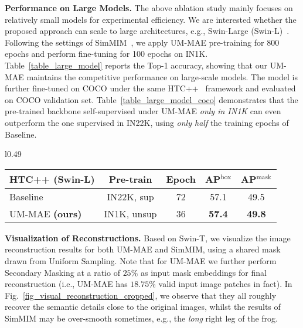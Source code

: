 \documentclass{article}
\begin{document}
\textbf{Performance on Large Models.} The above ablation study mainly focuses on relatively small models for experimental efficiency. We are interested whether the proposed approach can scale to large architectures, e.g., Swin-Large (Swin-L)~\cite{liu2021swin}. Following the settings of SimMIM~\cite{xie2021simmim}, we apply UM-MAE pre-training for 800 epochs and perform fine-tuning for 100 epochs on IN1K. 
Table~\ref{table_large_model} reports the Top-1 accuracy, showing that our UM-MAE maintains the competitive performance on large-scale models. The model is further fine-tuned on COCO under the same HTC++~\cite{chen2019hybrid,liu2021swin} framework and evaluated on COCO validation set. Table~\ref{table_large_model_coco} demonstrates that the pre-trained backbone self-supervised under UM-MAE \emph{only in IN1K} can even outperform the one supervised in IN22K, 
using \emph{only half} the training epochs of Baseline. 




\begin{wraptable}{l}{0.49\textwidth}
\begin{minipage}[ht]{0.49\textwidth}
\vspace{-10pt}
    \renewcommand\arraystretch{1.2}
    \setlength{\tabcolsep}{4.pt}
    \footnotesize
    \centering
    \resizebox{\textwidth}{!}
    {
        \begin{tabular}{l|c|c|cc}
        \hline
HTC++ (Swin-L)  & Pre-train & Epoch & AP$^{\text{box}}$ &  AP$^{\text{mask}}$ \\\hline
        Baseline~\cite{liu2021swin}& IN22K, sup & 72  & 57.1 & 49.5 \\
        UM-MAE \textbf{(ours)}     & IN1K, unsup & 36 & \textbf{57.4} & \textbf{49.8} \\
        \hline
        \end{tabular}
    }
	\vspace{-6pt}
	\caption{\textbf{COCO Performance on large models.} The result of the Baseline refers to the paper~\cite{liu2021swin}. ``Epoch'': training schedule on COCO.
	}
\label{table_large_model_coco}
\vspace{-18pt}
\end{minipage} \vspace{12pt}
\end{wraptable}
\textbf{Visualization of Reconstructions.} Based on Swin-T, we visualize the image reconstruction results for both UM-MAE and SimMIM, using a shared mask drawn from Uniform Sampling. Note that for UM-MAE we further perform Secondary Masking at a ratio of $25\%$ as input mask embeddings for final reconstruction (i.e., UM-MAE has $18.75\%$ valid input image patches in fact). In Fig.~\ref{fig_visual_reconstruction_cropped}, we observe that they all roughly recover the semantic details close to the original images, whilst the results of SimMIM may be over-smooth sometimes, e.g., the \emph{long} right leg of the frog. 
\end{document}
